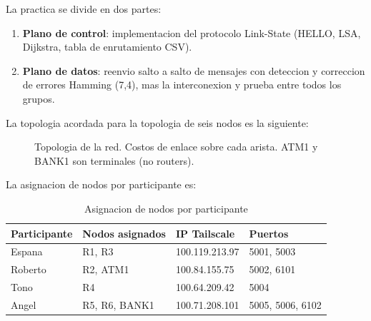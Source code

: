 ﻿\documentclass[12pt, a4paper]{article}
\begin{document}
La practica se divide en dos partes:
\begin{enumerate}
    \item \textbf{Plano de control}: implementacion del protocolo Link-State
          (HELLO, LSA, Dijkstra, tabla de enrutamiento CSV).
    \item \textbf{Plano de datos}: reenvio salto a salto de mensajes con
          deteccion y correccion de errores Hamming (7,4), mas la interconexion
          y prueba entre todos los grupos.
\end{enumerate}

La topologia acordada para la topologia de seis nodos es la siguiente:

\begin{figure}[H]
\centering
{}
\caption{Topologia de la red. Costos de enlace sobre cada arista. ATM1 y BANK1 son terminales (no routers).}
\end{figure}

La asignacion de nodos por participante es:

\begin{table}[H]
    \centering
    \caption{Asignacion de nodos por participante}
    \begin{tabular}{llll}
        \toprule
        \textbf{Participante} & \textbf{Nodos asignados} & \textbf{IP Tailscale} & \textbf{Puertos} \\
        \midrule
        Espana   & R1, R3      & 100.119.213.97 & 5001, 5003  \\
        Roberto  & R2, ATM1    & 100.84.155.75  & 5002, 6101  \\
        Tono     & R4          & 100.64.209.42  & 5004        \\
        Angel    & R5, R6, BANK1 & 100.71.208.101 & 5005, 5006, 6102 \\
        \bottomrule
    \end{tabular}
\end{table}
\end{document}
